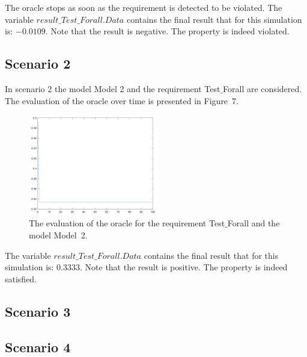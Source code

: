 \documentclass[12pt]{extarticle}
\newcommand{\<}{\langle}
\renewcommand{\>}{\rangle}
\theoremstyle{definition}
\begin{document}
The oracle stops as soon as the requirement is detected to be violated.
The variable  $result\_Test\_Forall.Data$  contains the final result that for this simulation is: $-0.0109$.
Note that the result is negative. 
The property is indeed violated.

\subsection{Scenario 2}
In scenario 2 the model Model 2 and the requirement Test$\_$Forall are considered. 
The evaluation of the oracle over time is presented in Figure~7.

\begin{figure}[h]
\caption{The evaluation of the oracle for the requirement Test$\_$Forall  and the model Model~2.}
  \centering
    \includegraphics[width=0.5\textwidth]{Manual/resModel2TestForall.png}
\end{figure}

The variable $result\_Test\_Forall.Data$ contains the final result that for this simulation is: $0.3333$.
Note that the result is positive.
The property is indeed satisfied.


\subsection{Scenario 3}

\subsection{Scenario 4}
\end{document}
